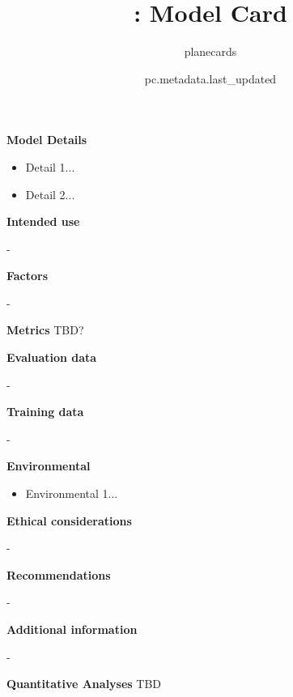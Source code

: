 \documentclass{article}
\title{\VAR{pc.metadata.name}: Model Card}
\author{planecards}
\date{pc.metadata.last_updated}
\begin{document}
\newenvironment{mcsection}[1]
    {
        \textbf{#1}


        \begin{itemize}[leftmargin=*,topsep=0pt,itemsep=-1ex,partopsep=1ex,parsep=1ex,after=\vspace{\medskipamount}]
    }
    {
        \end{itemize}
    }

\begin{adjustwidth}{-60pt}{-30pt}
\begin{singlespace}

\begin{tcolorbox}[title=\textbf{\VAR{pc.metadata.name} : Model Card},
    breakable, sharp corners, boxrule=0.7pt]

\begin{mcsection}{Model Details}
    \item Detail 1...
    \item Detail 2...
\end{mcsection}

\textbf{Intended use}
    \item - 

\textbf{Factors}
    \item - 

\textbf{Metrics}
TBD?

\textbf{Evaluation data}
    \item - 

\textbf{Training data}
    \item - 

\begin{mcsection}{Environmental}
    \item Environmental 1...
\end{mcsection}

\textbf{Ethical considerations}
    \item - 

\textbf{Recommendations}
    \item - 

\textbf{Additional information}
    \item - 

\textbf{Quantitative Analyses}
TBD

\end{tcolorbox}
\end{singlespace}
\end{adjustwidth}
\end{document}
